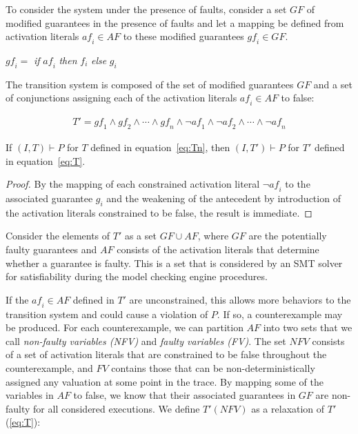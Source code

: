 
To consider the system under the presence of faults, consider a set $GF$ of modified guarantees in the presence of faults and let a mapping be defined from activation literals $\mathit{af_i} \in AF$ to these modified guarantees $\mathit{gf_i} \in GF$. 
\begin{center}
$\mathit{gf_i} =$ \textit{if} $\mathit{af_i}$ \textit{then} $f_i$ \textit{else} $g_i$
\label{eq:sigma}
\end{center}

The transition system is composed of the set of modified guarantees $GF$ and a set of conjunctions assigning each of the activation literals $\mathit{af_i} \in AF$ to false: 

\begin{gather}
T' = \mathit{gf_1} \land \mathit{gf_2} \land \cdots \land \mathit{gf_n} \land \neg \mathit{af_1} \land \neg \mathit{af_2} \land \cdots \land \neg \mathit{af_n}
\label{eq:T}
\end{gather}

\begin{theorem} If $(I,T) \vdash P$ for $T$ defined in equation~\ref{eq:Tn}, then $(I,T') \vdash P$ for $T'$ defined in equation~\ref{eq:T}.
\begin{proof}
By the mapping of each constrained activation literal $\neg \mathit{af_i}$ to the associated guarantee $g_i$ and the weakening of the antecedent by introduction of the activation literals constrained to be false, the result is immediate.
\end{proof}
\end{theorem}

Consider the elements of $T'$ as a set $GF \cup AF$, where $GF$ are the potentially faulty guarantees and $AF$ consists of the activation literals that determine whether a guarantee is faulty. This is a set that is considered by an SMT solver for satisfiability during the model checking engine procedures. 

If the $\mathit{af_i} \in \mathit{AF}$ defined in $T'$ are unconstrained, this allows more behaviors to the transition system and could cause a violation of $P$. If so, a counterexample may be produced. For each counterexample, we can partition $\mathit{AF}$ into two sets that we call {\em non-faulty variables (NFV)} and {\em faulty variables (FV)}.  The set $\mathit{NFV}$ consists of a set of activation literals that are constrained to be false throughout the counterexample, and $\mathit{FV}$ contains those that can be non-deterministically assigned any valuation at some point in the trace. By mapping some of the variables in $\mathit{AF}$ to false, we know that their associated guarantees in $\mathit{GF}$ are non-faulty for all considered executions. We define $T'(\mathit{NFV})$ as a relaxation of $T'$ (\ref{eq:T}):

